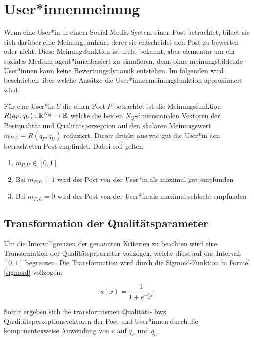 \chapter{User*innenmeinung} %

Wenn eine User*in in einem Social Media System einen Post betrachtet, bildet sie sich darüber eine Meinung, anhand derer sie entscheidet den Post zu bewerten oder nicht. Diese Meinungsfunktion ist nicht bekannt, aber elementar um ein soziales Medium agent*innenbasiert zu simulieren, denn ohne meinungsbildende User*innen kann keine Bewertungsdynamik entstehen. Im folgenden wird beschrieben über welche Ansätze die User*innenmeinungsfunktion approximiert wird.


Für eine User*in $U$ die einen Post $P$ betrachtet ist die Meinungsfunktion $R(q_P,q_U): \mathbb{R}^{N_Q} \rightarrow \mathbb{R}$ welche die beiden $N_Q$-dimensionalen Vektoren der Postqualität und Qualitätsperzeption auf den skalaren Meinungswert $m_{P,U} = R(q_P, q_U)$ reduziert. Dieser drückt aus wie gut die User*in den betrachteten Post empfindet. Dabei soll gelten:

\begin{enumerate}
	\item $m_{P,U} \in [0,1]$
	\item Bei $m_{P,U} = 1$ wird der Post von der User*in als maximal gut empfunden
	\item Bei $m_{P,U} = 0$ wird der Post von der User*in als maximal schlecht empfunden
\end{enumerate}

\section{Transformation der Qualitätsparameter}

Um die Intervallgrenzen der genannten Kriterien zu beachten wird eine Transormation der Qualitätsparameter vollzogen, welche diese auf das Intervall $[0,1]$ 
begrenzen. Die Transformation wird durch die {Sigmoid}-Funktion in Formel \ref{sigmoid} vollzogen:

\begin{equation}
\label{sigmoid}
s(x) = \frac{1}{1 + e^{-\frac{1}{2}x}}
\end{equation}

Somit ergeben sich die transformierten Qualitäts- bwz Qualitätsperzeptionsvektoren der Post und User*innen durch die komponentenweise Anwendung von $s$ auf $q_P$ und $q_U$

